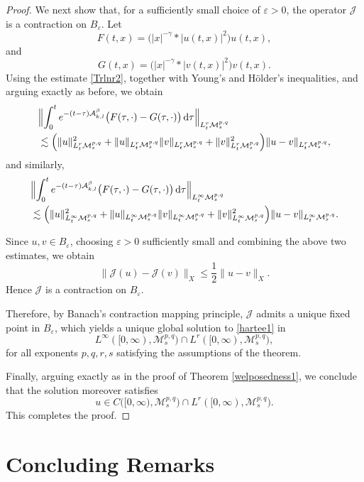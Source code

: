 \documentclass[12pt,reqno,a4paper]{amsart}
\numberwithin{equation}{section}
\theoremstyle{plain}
\theoremstyle{definition}
\theoremstyle{remark}
\def\M{\mathcal{M}}
\def \Ad{\mathcal{A}_{k,l}}
\def \M{{\mathcal M}}
\begin{document}
\begin{proof}
{We next show that, for a sufficiently small choice of $\varepsilon>0$, the operator $\mathcal{J}$ is a contraction on $B_{\varepsilon}$.} Let
\[
F(t,x)
=
\bigl(|x|^{-\gamma}*|u(t,x)|^{2}\bigr)u(t,x),
\]
and
\[
G(t,x)
=
\bigl(|x|^{-\gamma}*|v(t,x)|^{2}\bigr)v(t,x).
\]
Using the estimate \eqref{Trlnr2}, together with Young's and
H\"older's inequalities, and arguing exactly as before, we obtain
\begin{align*}
&
\Bigl\|
\int_{0}^{t}
e^{-(t-\tau)\Ad^{\beta}}
\bigl(F(\tau,\cdot)-G(\tau,\cdot)\bigr)
\,\mathrm{d}\tau
\Bigr\|_{L^{r}_{t}\M^{p,q}_{s}}
\\
&\lesssim
\Bigl(
\|u\|_{L^{r}_{t}\M^{p,q}_{s}}^{2}
+
\|u\|_{L^{r}_{t}\M^{p,q}_{s}}
\|v\|_{L^{r}_{t}\M^{p,q}_{s}}
+
\|v\|_{L^{r}_{t}\M^{p,q}_{s}}^{2}
\Bigr)
\|u-v\|_{L^{r}_{t}\M^{p,q}_{s}},
\end{align*}
and similarly,
\begin{align*}
&
\Bigl\|
\int_{0}^{t}
e^{-(t-\tau)\Ad^{\beta}}
\bigl(F(\tau,\cdot)-G(\tau,\cdot)\bigr)
\,\mathrm{d}\tau
\Bigr\|_{L^{\infty}_{t}\M^{p,q}_{s}}
\\
&\lesssim
\Bigl(
\|u\|_{L^{\infty}_{t}\M^{p,q}_{s}}^{2}
+
\|u\|_{L^{\infty}_{t}\M^{p,q}_{s}}
\|v\|_{L^{\infty}_{t}\M^{p,q}_{s}}
+
\|v\|_{L^{\infty}_{t}\M^{p,q}_{s}}^{2}
\Bigr)
\|u-v\|_{L^{\infty}_{t}\M^{p,q}_{s}}.
\end{align*}

Since $u,v\in B_{\varepsilon}$, choosing $\varepsilon>0$
sufficiently small and combining the above two estimates, we obtain
\[
\|\mathcal{J}(u)-\mathcal{J}(v)\|_{X}
\leq
\frac{1}{2}
\|u-v\|_{X}.
\]
Hence $\mathcal{J}$ is a contraction on $B_{\varepsilon}$.

Therefore, by Banach's contraction mapping principle,
$\mathcal{J}$ admits a unique fixed point in $B_{\varepsilon}$,
which yields a unique global solution to \eqref{hartee1} in
\[
L^{\infty}([0,\infty),\M^{p,q}_{s})
\cap
L^{r}([0,\infty),\M^{p,q}_{s}),
\]
for all exponents $p,q,r,s$ satisfying the assumptions of the theorem.

Finally, arguing exactly as in the proof of Theorem
\ref{welposedness1}, we conclude that the solution moreover satisfies
\[
u
\in
C\bigl([0,\infty),\M^{p,q}_{s}\bigr)
\cap
L^{r}([0,\infty),\M^{p,q}_{s}).
\]
This completes the proof.
 \end{proof}





 \section*{Concluding Remarks}
\end{document}
